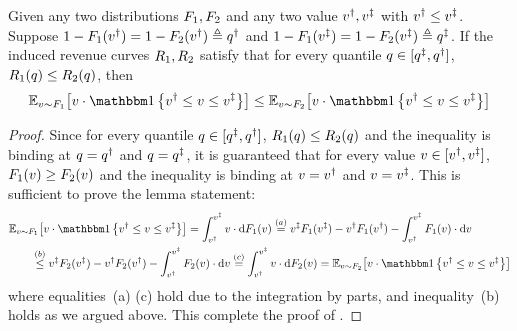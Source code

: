 \begin{lemma}
\label{lem:revenue curve monotonicity}
    Given any two distributions $F_1,F_2$ and any two value $v^\dagger, v^\ddagger$ with $v^\dagger \leq v^\ddagger$. 
    Suppose $1-F_1(v^\dagger) = 1-F_2(v^\dagger)\triangleq q^\dagger$ and $1-F_1(v^\ddagger) = 1-F_2(v^\ddagger)\triangleq q^\ddagger$. If the induced revenue curves $R_1,R_2$ satisfy that for every quantile $q \in[q^\ddagger,q^\dagger]$,
    $R_1(q) \leq R_2(q)$,
    then 
    \begin{align*}
        \expect[\val\sim\buyerdist_1]{\val\cdot \indicator{\val\primed \leq \val\leq \val\doubleprimed}}
        \leq 
        \expect[\val\sim\buyerdist_2]{\val\cdot \indicator{\val\primed \leq \val\leq \val\doubleprimed}}
    \end{align*}
\end{lemma}
\begin{proof}
    Since for every quantile $q \in[q^\ddagger,q^\dagger]$,
    $R_1(q) \leq R_2(q)$ and the inequality is binding at $q = q^\dagger$ and $q = q^\ddagger$, it is guaranteed that for every value $v\in[v^\dagger,v^\ddagger]$, $F_1(v) \geq F_2(v)$
    and the inequality is binding at $v = v^\dagger$ and $v = v^\ddagger$. This is sufficient to prove the lemma statement:
    \begin{align*}
        &\expect[\val\sim\buyerdist_1]{\val\cdot \indicator{\val\primed \leq \val\leq \val\doubleprimed}} 
        =
        \displaystyle\int_{\val\primed}^{\val\doubleprimed}
        \val\cdot \d \buyercdf_1(\val) 
        \overset{(a)}{=}
        \val\doubleprimed \buyercdf_1(\val\doubleprimed)
        -
        \val\primed\buyercdf_1(\val\primed)
        -
        \displaystyle\int_{\val\primed}^{\val\doubleprimed}
        \buyercdf_1(\val) \cdot \d \val
        \\
        &\qquad\overset{(b)}{\leq}
        \val\doubleprimed \buyercdf_2(\val\doubleprimed)
        -
        \val\primed\buyercdf_2(\val\primed)
        -
        \displaystyle\int_{\val\primed}^{\val\doubleprimed}
        \buyercdf_2(\val) \cdot \d \val
        \overset{(c)}{=}  
        \displaystyle\int_{\val\primed}^{\val\doubleprimed}
        \val\cdot \d \buyercdf_2(\val) 
        =
        \expect[\val\sim\buyerdist_2]{\val\cdot \indicator{\val\primed \leq \val\leq \val\doubleprimed}} 
    \end{align*}
    where equalities~(a) (c) hold due to the integration by parts, and inequality~(b) holds as we argued above. This complete the proof of .
\end{proof}

